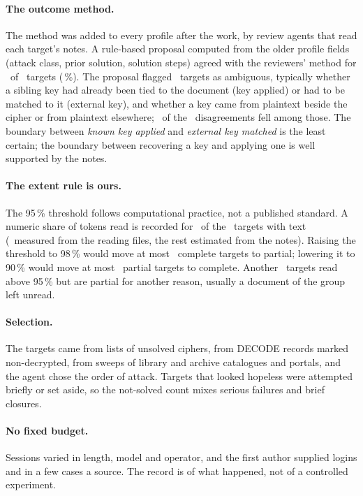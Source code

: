 \documentclass[11pt]{article}
\begin{document}
\paragraph{The outcome method.} The method was added to every profile after the work, by review agents that read each target's notes. A rule-based proposal computed from the older profile fields (attack class, prior solution, solution steps) agreed with the reviewers' method for \Nreviewagree\ of \Nreview\ targets (\PctReviewagree\,\%). The proposal flagged \Nreviewflagged\ targets as ambiguous, typically whether a sibling key had already been tied to the document (key applied) or had to be matched to it (external key), and whether a key came from plaintext beside the cipher or from plaintext elsewhere; \Nflaggedchanged\ of the \Nreviewchanged\ disagreements fell among those. The boundary between \emph{known key applied} and \emph{external key matched} is the least certain; the boundary between recovering a key and applying one is well supported by the notes.

\paragraph{The extent rule is ours.} The 95\,\% threshold follows computational practice, not a published standard. A numeric share of tokens read is recorded for \Nfrac\ of the \Nobtained\ targets with text (\Nfracmeasured\ measured from the reading files, the rest estimated from the notes). Raising the threshold to 98\,\% would move at most \Nbarup\ complete targets to partial; lowering it to 90\,\% would move at most \Nbardown\ partial targets to complete. Another \Npartialhigh\ targets read above 95\,\% but are partial for another reason, usually a document of the group left unread.

\paragraph{Selection.} The targets came from lists of unsolved ciphers, from DECODE records marked non-decrypted, from sweeps of library and archive catalogues and portals, and the agent chose the order of attack. Targets that looked hopeless were attempted briefly or set aside, so the not-solved count mixes serious failures and brief closures.

\paragraph{No fixed budget.} Sessions varied in length, model and operator, and the first author supplied logins and in a few cases a source. The record is of what happened, not of a controlled experiment.
\end{document}
